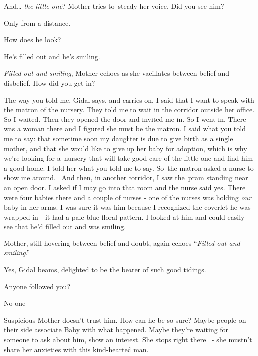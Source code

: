 \documentclass[12pt]{book}
\begin{document}
{\textquotedbl}And{\dots} \textit{the little one}?{\textquotedbl} Mother tries to~steady her voice.{\textquotedbl} Did
you see him?{\textquotedbl}

{\textquotedbl}Only from a distance.{\textquotedbl}

{\textquotedbl}How does he look?{\textquotedbl}

{\textquotedbl}He's filled out and he's smiling.{\textquotedbl}

{\textquotedbl}\textit{Filled out and smiling},{\textquotedbl} Mother echoes as she vacillates between belief and
disbelief. {\textquotedbl}How did you get in?{\textquotedbl}

{\textquotedbl}The way you told me,{\textquotedbl} Gidal says, and carries on, {\textquotedbl}I said that I want to
speak with the matron of the nursery. They told me to wait in the corridor outside her office. So I waited. Then they
opened the door and invited me in. So I went in. There was a woman there and I figured she must be the matron. I said
what you told me to say: that sometime soon my daughter is due to give birth as a single mother, and that she would
like to give up her baby for adoption, which is why we're looking for a~nursery that will take good care of the little
one and find him a good home. I told her what you told me to say. So~the matron asked a nurse to show me around.~ And
then, in another corridor, I saw the~pram standing near an open door. I asked if I may go into that room and the nurse
said yes. There were four babies there and a couple of nurses - one of the nurses was holding\textit{ our }baby in her
arms. I was sure it was him because I recognized the coverlet he was wrapped in - it had a pale blue floral pattern. I
looked at him and could easily see that he'd filled out and was smiling. {\textquotedbl}

Mother, still hovering between belief and doubt, again{ }echoes ``\textit{Filled
out and smiling}.''

{\textquotedbl}Yes,{\textquotedbl} Gidal beams, delighted to be the bearer of such good tidings.

{\textquotedbl}Anyone followed you?{\textquotedbl}

{\textquotedbl}No one -{\textquotedbl}

Suspicious{ }Mother doesn't trust him. How can he be so sure? Maybe people on
their side associate Baby with what happened. Maybe they're waiting for someone to ask about him, show an interest. She
stops right there \ {}- she mustn't share her anxieties with this kind-hearted man.
\end{document}

